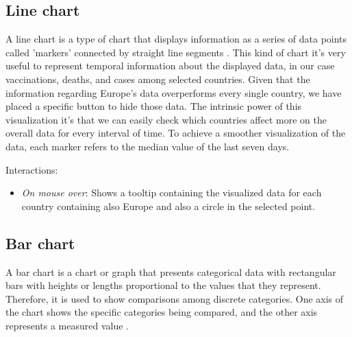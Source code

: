 \documentclass[10pt,conference]{IEEEtran}
\begin{document}
\subsection{Line chart}
A line chart is a type of chart that displays information as a series of data points called ’markers’ connected by straight 
line segments \cite{line}. This kind of chart it’s very useful to represent temporal information about the displayed data,
in our case vaccinations, deaths, and cases among selected countries. Given that the information regarding Europe's data 
overperforms every single country, we have placed a specific button to hide those data. The intrinsic power of this visualization it’s 
that we can easily check which countries affect more on the overall data for every interval of time.
To achieve a smoother visualization of the data, each marker refers to the median value of the last seven days.

Interactions:
\begin{itemize}
 \item {\em On mouse over}: Shows a tooltip containing the visualized data for each country containing also Europe and also a circle in the selected point.
\end{itemize}

\begin{figure}
\end{figure}

\subsection{Bar chart}
A bar chart is a chart or graph that presents categorical data with rectangular bars with heights or lengths proportional 
to the values that they represent. Therefore, it is used to show comparisons among discrete categories. One axis of the chart 
shows the specific categories being compared, and the other axis represents a measured value \cite{barchart}.
\end{document}
